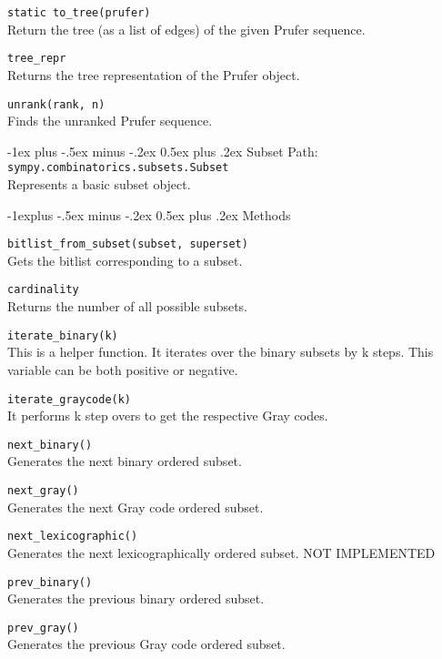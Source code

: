 \documentclass[10pt,landscape]{article}
\makeatletter
\renewcommand{\section}{\@startsection{section}{1}{0mm}%
                                {-1ex plus -.5ex minus -.2ex}%
                                {0.5ex plus .2ex}%
                                {\normalfont\large\bfseries}}
\renewcommand{\subsection}{\@startsection{subsection}{2}{0mm}%
                                {-1explus -.5ex minus -.2ex}%
                                {0.5ex plus .2ex}%
                                {\normalfont\normalsize\bfseries}}
\makeatother
\begin{document}
\begin{multicols}{3}
\verb!static to_tree(prufer)!\\
Return the tree (as a list of edges) of the given Prufer sequence.



\verb!tree_repr!\\
Returns the tree representation of the Prufer object.


\verb!unrank(rank, n)!\\
Finds the unranked Prufer sequence.


\section{Subset}
Path: \verb!sympy.combinatorics.subsets.Subset!\\
Represents a basic subset object.

\subsection{Methods}

\verb!bitlist_from_subset(subset, superset)!\\
Gets the bitlist corresponding to a subset.


\verb!cardinality!\\
Returns the number of all possible subsets.



\verb!iterate_binary(k)!\\
This is a helper function. It iterates over the binary subsets by k steps. This variable can be both positive or negative.



\verb!iterate_graycode(k)!\\
It performs k step overs to get the respective Gray codes.


\verb!next_binary()!\\
Generates the next binary ordered subset.


\verb!next_gray()!\\
Generates the next Gray code ordered subset.


\verb!next_lexicographic()!\\
Generates the next lexicographically ordered subset. NOT IMPLEMENTED

\verb!prev_binary()!\\
Generates the previous binary ordered subset.



\verb!prev_gray()!\\
Generates the previous Gray code ordered subset.




\end{multicols}
\end{document}
